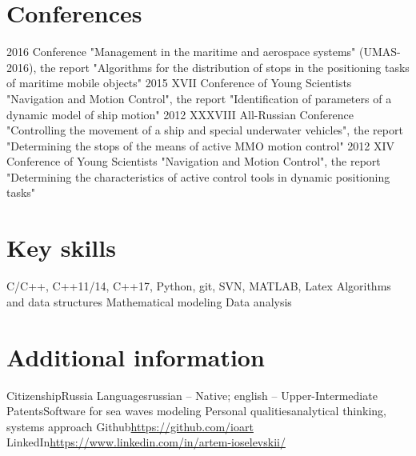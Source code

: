 \documentclass[11pt,a4paper]{moderncv}
\begin{document}
\section{Conferences}
\cvline
    {2016}
    {Conference "Management in the maritime and aerospace systems" (UMAS-2016),
    the report "Algorithms for the distribution of stops in the positioning tasks of maritime mobile objects"}
\cvline
    {2015}
    {XVII Conference of Young Scientists "Navigation and Motion Control",
    the report "Identification of parameters of a dynamic model of ship motion"}
\cvline
    {2012}
    {XXXVIII All-Russian Conference "Controlling the movement of a ship and special underwater vehicles",
    the report "Determining the stops of the means of active MMO motion control"}
\cvline
    {2012}
    {XIV Conference of Young Scientists "Navigation and Motion Control",
    the report "Determining the characteristics of active control tools in dynamic positioning tasks"}

\section{Key skills}
\cvline
    {}
    {C/C++, C++11/14, C++17, Python, git, SVN, MATLAB, Latex}
\cvline
    {}
    {Algorithms and data structures}
\cvline
    {}
    {Mathematical modeling}
\cvline
    {}{Data analysis}

\section{Additional information}
\cvline
    {Citizenship}{Russia}
\cvline
    {Languages}{russian -- Native; english -- Upper-Intermediate}
\cvline
    {Patents}{Software for sea waves modeling}
\cvline
    {Personal qualities}{analytical thinking, systems approach}
\cvline
    {Github}{\href{https://github.com/ioart}
                  {https://github.com/ioart}}
\cvline
    {LinkedIn}{\href{https://www.linkedin.com/in/artem-ioselevskii/}
                    {https://www.linkedin.com/in/artem-ioselevskii/}}
\end{document}
